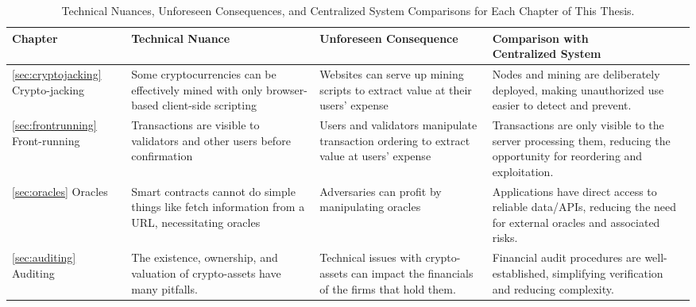 \begin{table}[t]
    \centering
    \begin{adjustbox}{width=\textwidth}
    \begin{tabular}{|p{3cm}|p{4.25cm}|p{5.25cm}|p{5cm}|}
        \hline
        \rowcolor{lightgray}
        \textbf{Chapter} & \textbf{Technical Nuance} & \textbf{Unforeseen Consequence} & \textbf{Comparison with \newline Centralized System} \\ \hline
        
        \ref{sec:cryptojacking} Crypto-jacking &
        Some cryptocurrencies can be effectively mined with only browser-based client-side scripting &
        Websites can serve up \newline mining scripts to extract value at their users' expense  &
        Nodes and mining are \newline deliberately deployed, making unauthorized use easier to detect and prevent. \\ \hline
        
        \ref{sec:frontrunning} Front-running &
        Transactions are visible to validators and other users before confirmation &
        Users and validators \newline manipulate transaction \newline ordering to extract value at users' expense  &
        Transactions are only visible to the server processing them, reducing the opportunity for reordering and exploitation. \\ \hline
        
        \ref{sec:oracles} Oracles &
        Smart contracts cannot do simple things like fetch information from a URL, necessitating oracles &
        Adversaries can profit by \newline manipulating oracles &
        Applications have direct \newline access to reliable data/APIs, reducing the need for external oracles and associated risks. \\ \hline
        
        \ref{sec:auditing} Auditing &
        The existence, ownership, and valuation of crypto-assets have many pitfalls. &
        Technical issues with \newline crypto-assets can impact the financials of the firms that hold them. &
        Financial audit procedures are well-established, \newline simplifying verification and reducing complexity. \\ \hline
    \end{tabular}
    \end{adjustbox}
    \caption[Nuances, Unforeseen Consequences, and Centralized Systems]{Technical Nuances, Unforeseen Consequences, and Centralized System Comparisons for Each Chapter of This Thesis.}
    \label{tab:technical_nuances}
\end{table}



